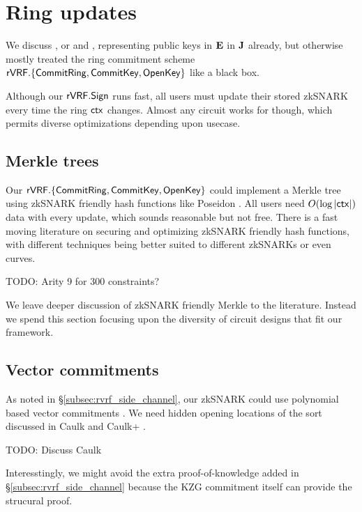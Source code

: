 \section{Ring updates}
\label{sec:ring_updates}

We discuss \pifast, or \pisk and \pipk, representing public keys
 in ${\mathbf{E}}$ in ${\mathbf{J}}$ already,
but otherwise mostly treated the ring commitment scheme
${\mathsf{rVRF}}.\{ {\mathsf{CommitRing}}, {\mathsf{CommitKey}}, {\mathsf{OpenKey}} \}$ like a black box.

Although our ${\mathsf{rVRF}}.{\mathsf{Sign}}$ runs fast, all users must update their
stored zkSNARK \pipk every time the ring $\mathsf{ctx}$ changes.
Almost any circuit works for \pipk though,
 which permits diverse optimizations depending upon usecase.


\subsection{Merkle trees} %

Our ${\mathsf{rVRF}}.\{ {\mathsf{CommitRing}}, {\mathsf{CommitKey}}, {\mathsf{OpenKey}} \}$ could implement a
Merkle tree using zkSNARK friendly hash functions like Poseidon \cite{poseidon}.
%
All users need $O(\log |\mathsf{ctx}|)$ data with every update, which sounds
reasonable but not free.  There is a fast moving literature on securing
and optimizing zkSNARK friendly hash functions, with different techniques
being better suited to different zkSNARKs or even curves.

TODO: Arity 9 for 300 constraints?   %

We leave deeper discussion of zkSNARK friendly Merkle to the literature.
Instead we spend this section focusing upon the diversity of circuit
designs that fit our framework.


\subsection{Vector commitments}

As noted in \S\ref{subsec:rvrf_side_channel}, our zkSNARK \pipk could use
polynomial based vector commitments \cite{KZG}. %
We need hidden opening locations of the sort discussed in Caulk \cite{caulk} and Caulk+ \cite{caulk+}.

TODO: Discuss Caulk

Interesstingly, we might avoid the extra proof-of-knowledge added
in \S\ref{subsec:rvrf_side_channel} because the KZG commitment itself
can provide the strucural proof.

